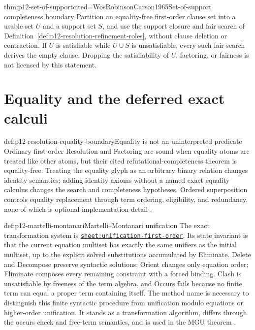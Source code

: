 \begin{hbtheorem}{thm:p12-set-of-support}{cited=WosRobinsonCarson1965}{Set-of-support completeness boundary}
Partition an equality-free first-order clause set into a usable set \(U\) and
a support set \(S\), and use the support closure and fair search of
Definition~\ref{def:p12-resolution-refinement-roles}, without clause deletion
or contraction.  If \(U\) is satisfiable while \(U\cup S\) is unsatisfiable,
every such fair search derives the empty clause.  Dropping the
satisfiability of \(U\), factoring, or fairness is not licensed by this
statement.
\end{hbtheorem}

\section{Equality and the deferred exact calculi}

\begin{proofboundary}{def:p12-resolution-equality-boundary}{Equality is not an uninterpreted predicate}
Ordinary first-order Resolution and Factoring are sound when equality atoms are
treated like other atoms, but their cited refutational-completeness theorem is
equality-free.  Treating the equality glyph as an arbitrary binary relation
changes identity semantics; adding identity axioms without a named exact
equality calculus changes the search and completeness hypotheses.  Ordered
superposition controls equality replacement through term ordering,
eligibility, and redundancy, none of which is optional implementation detail
\cite{BachmairGanzinger2001}.
\end{proofboundary}

\begin{hbmethod}{def:p12-martelli-montanari}{Martelli--Montanari unification}
The exact transformation system is
\hyperref[sheet:unification-first-order]{\texttt{sheet:unification-first-order}}.
Its state invariant is that the current equation multiset has exactly the same
unifiers as the initial multiset, up to the explicit solved substitutions
accumulated by Eliminate. Delete and Decompose preserve syntactic solutions;
Orient changes only equation order; Eliminate composes every remaining
constraint with a forced binding. Clash is unsatisfiable by freeness of the
term algebra, and Occurs fails because no finite term can equal a proper term
containing itself. The method name is necessary to distinguish this finite
syntactic procedure from unification modulo equations or higher-order
unification. It stands as a transformation algorithm, differs through the
occurs check and free-term semantics, and is used in the MGU theorem
\cite{MartelliMontanari1982,BaaderSnyder2001}.
\end{hbmethod}

